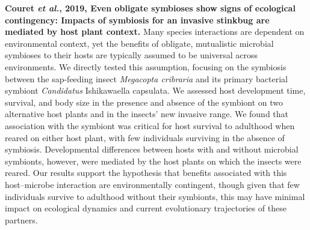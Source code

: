 \documentclass[11pt]{article}
\begin{document}
\begin{sloppypar}
\textbf{Couret \textit{et al.}, 2019, Even obligate symbioses show signs of ecological contingency: Impacts of symbiosis for an invasive stinkbug are mediated by host plant context.} \newline
Many species interactions are dependent on environmental context, yet the benefits of obligate, mutualistic microbial symbioses to their hosts are typically assumed to be universal across environments. 
We directly tested this assumption, focusing on the symbiosis between the sap-feeding insect \textit{Megacopta cribraria} and its primary bacterial symbiont \textit{Candidatus} Ishikawaella capsulata. 
We assessed host development time, survival, and body size in the presence and absence of the symbiont on two alternative host plants and in the insects' new invasive range. 
We found that association with the symbiont was critical for host survival to adulthood when reared on either host plant, with few individuals surviving in the absence of symbiosis. 
Developmental differences between hosts with and without microbial symbionts, however, were mediated by the host plants on which the insects were reared. 
Our results support the hypothesis that benefits associated with this host–microbe interaction are environmentally contingent, though given that few individuals survive to adulthood without their symbionts, this may have minimal impact on ecological dynamics and current evolutionary trajectories of these partners.

\end{sloppypar}
\end{document}
